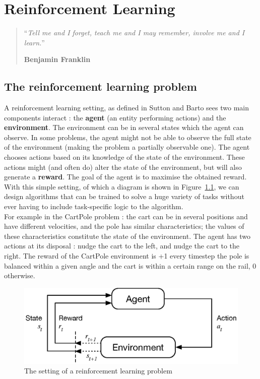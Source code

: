 \chapter{Reinforcement Learning}
\begin{quotation}
\noindent ``\emph{Tell me and I forget, teach me and I may remember, involve me
	and I learn.}''
\begin{flushright}\textbf{Benjamin Franklin}\end{flushright}
\end{quotation}

\vspace*{0.5cm}


\section{The reinforcement learning problem}
A reinforcement learning setting, as defined in Sutton and Barto \cite{suttonbarto}
sees two main components interact : the
\textbf{agent} (an entity performing actions) and the \textbf{environment}. 
The environment can be in several states which the agent
can observe. In some problems, the agent might not be able to observe the
full state of the environment (making the problem a partially observable one).  
The agent chooses actions based on its knowledge of the state of the
environment. These actions might (and often do) alter the state of the
environment, but will also generate a \textbf{reward}.  The
goal of the agent is to maximise the obtained reward.\\

With this simple setting, of which a diagram is shown in Figure~\ref{fig:rl},
we can design algorithms that can be trained to solve a huge variety of tasks
without ever having to include task-specific logic to the algorithm.\\

For example in the CartPole problem : the cart can be in several 
positions and have different velocities, and the pole has similar 
characteristics; the values of these characteristics constitute the state
of the environment. The agent has two actions at its disposal : nudge
the cart to the left, and nudge the cart to the right. 
The reward of the CartPole environment is +1 every timestep the pole is balanced
within a given angle 
and the cart is within a certain range on the rail, 0 otherwise.


\begin{figure}[]
	\centering
	\includegraphics[width=0.65\linewidth]{fig/rl.eps}
	\caption{The setting of a reinforcement learning problem 
		\cite{suttonbarto}}
	\label{fig:rl}
\end{figure}

